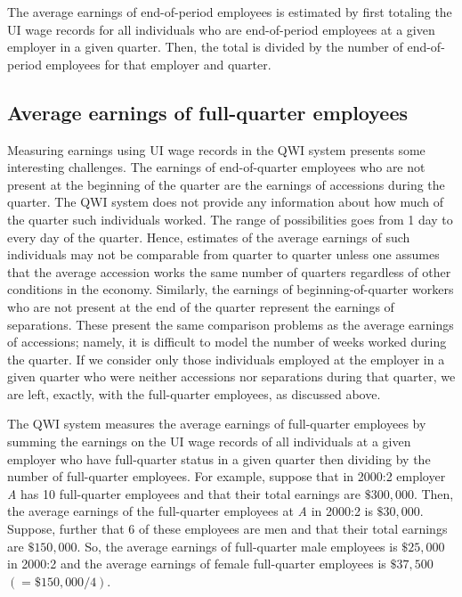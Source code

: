 
The average earnings of end-of-period employees is estimated by first
totaling the UI%
 wage records for all individuals who are end-of-period employees
at a given employer in a given quarter. Then, the total is divided by the
number of end-of-period employees for that employer and quarter.

\subsection{Average earnings of full-quarter employees}


Measuring earnings using UI%
 wage records in the QWI system presents some interesting
challenges. The earnings of end-of-quarter employees who are not present at
the beginning of the quarter are the earnings of accessions during the
quarter. The QWI system does not provide any information about how much of
the quarter such individuals worked. The range of possibilities goes from 1
day to every day of the quarter. Hence, estimates of the average earnings of
such individuals may not be comparable from quarter to quarter unless one
assumes that the average accession works the same number of quarters
regardless of other conditions in the economy. Similarly, the earnings of
beginning-of-quarter workers who are not present at the end of the quarter
represent the earnings of separations. These present the same comparison
problems as the average earnings of accessions; namely, it is difficult to
model the number of weeks worked during the quarter. If we consider only
those individuals employed at the employer in a given quarter who were
neither accessions nor separations during that quarter, we are left,
exactly, with the full-quarter employees, as discussed above.

The QWI system measures the average earnings of full-quarter employees by
summing the earnings on the {UI} wage records of all individuals at a given
employer who have full-quarter status in a given quarter then dividing by
the number of full-quarter employees. For example, suppose that in 2000:2
employer \textit{A} has 10 full-quarter employees and that their total
earnings are $\$300,000.$ Then, the average earnings of the full-quarter
employees at \textit{A} in 2000:2 is $\$30,000.$ Suppose, further that 6 of
these employees are men and that their total earnings are $\$150,000$. So,
the average earnings of full-quarter male employees is $\$25,000$ in 2000:2
and the average earnings of female full-quarter employees is $\$37,500$ $%
\left( =\$150,000/4\right) $.

